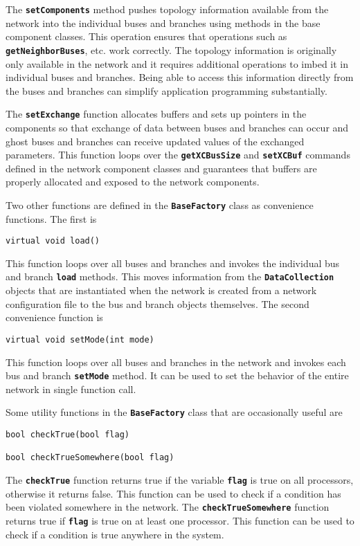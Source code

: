 The \texttt{\textbf{setComponents}} method pushes topology information available from the network into the individual buses and branches using methods in the base component classes. This operation ensures that operations such as \texttt{\textbf{getNeighborBuses}}, etc. work correctly. The topology information is originally only available in the network and it requires additional operations to imbed it in individual buses and branches. Being able to access this information directly from the buses and branches can simplify application programming substantially.

The \texttt{\textbf{setExchange}} function allocates buffers and sets up pointers in the components so that exchange of data between buses and branches can occur and ghost buses and branches can receive updated values of the exchanged parameters. This function loops over the \texttt{\textbf{getXCBusSize}} and \texttt{\textbf{setXCBuf}} commands defined in the network component classes and guarantees that buffers are properly allocated and exposed to the network components.

Two other functions are defined in the \texttt{\textbf{BaseFactory}} class as convenience functions. The first is

{
\color{red}
\begin{Verbatim}[fontseries=b]
virtual void load()
\end{Verbatim}
}

This function loops over all buses and branches and invokes the individual bus and branch \texttt{\textbf{load}} methods. This moves information from the \texttt{\textbf{DataCollection}} objects that are instantiated when the network is created from a network configuration file to the bus and branch objects themselves. The second convenience function is

{
\color{red}
\begin{Verbatim}[fontseries=b]
virtual void setMode(int mode)
\end{Verbatim}
}

This function loops over all buses and branches in the network and invokes each bus and branch \texttt{\textbf{setMode}} method. It can be used to set the behavior of the entire network in single function call.

Some utility functions in the \texttt{\textbf{BaseFactory}} class that are occasionally useful are

{
\color{red}
\begin{Verbatim}[fontseries=b]
bool checkTrue(bool flag)

bool checkTrueSomewhere(bool flag)
\end{Verbatim}
}

The \texttt{\textbf{checkTrue}} function returns true if the variable \texttt{\textbf{flag}} is true on all processors, otherwise it returns false. This function can be used to check if a condition has been violated somewhere in the network. The \texttt{\textbf{checkTrueSomewhere}} function returns true if \texttt{\textbf{flag}} is true on at least one processor. This function can be used to check if a condition is true anywhere in the system.
